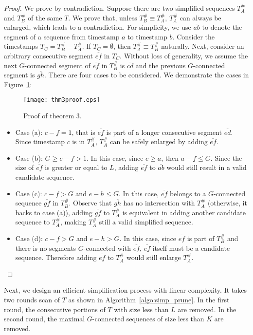 \begin{proof}
We prove by contradiction. Suppose there are two simplified sequences $T_A^\#$ and $T_B^\#$ of the same $T$. We prove that, unless $T_B^\# \equiv T_A^\#$, $T_A^\#$ can always be enlarged, which leads to a contradiction. For simplicity, we use $\overline{ab}$ to denote the segment of a sequence from timestamp $a$ to timestamp $b$.
Consider the timestamps $T_C=T_B^\# - T_A^\#$. If $T_C = \emptyset$, then $T_A^\# \equiv T_B^\#$ naturally. Next, consider an arbitrary consecutive segment $\overline{ef}$ in $T_C$. Without loss of generality, we assume the next $G$-connected segment of $\overline{ef}$ in $T_B^\#$ is $\overline{cd}$ and the previous $G$-connected segment is $\overline{gh}$. There are four cases to be considered. We demonstrate the cases in Figure~\ref{fig:proof_thm_3}:
\begin{figure}[h]
\centering
\texttt{[image: thm3proof.eps]}
\caption{Proof of theorem 3.}
\label{fig:proof_thm_3}
\end{figure}
\begin{itemize}
\item Case (a): $c-f = 1$, that is $\overline{ef}$ is part of a longer consecutive segment $\overline{ed}$. Since timestamp $c$ is in $T_A^\#$, $T_A^\#$ can be safely enlarged by adding $\overline{ef}$.
\item Case (b): $G \geq c-f> 1$. In this case, since $c\geq a$, then $a-f \leq G$. Since the size of $\overline{ef}$ is greater or equal to $L$, adding $\overline{ef}$ to $\overline{ab}$ would still result in a valid candidate sequence.
\item Case (c): $c-f > G$ and $e-h \leq G$. In this case, $\overline{ef}$ belongs to a $G$-connected sequence $\overline{gf}$ in $T_B^\#$. Observe that $\overline{gh}$ has no intersection with $T_A^\#$ (otherwise, it backs to case (a)), adding $\overline{gf}$ to $T_A^\#$ is equivalent in adding another candidate sequence to $T_A^\#$, making $T_A^\#$ still a valid simplified sequence.
\item Case (d): $c-f > G$ and $ e- h > G$. In this case, since $\overline{ef}$ is part of $T_B^\#$ and there is no segments $G$-connected with $\overline{ef}$, $\overline{ef}$ itself must be a candidate sequence. Therefore adding $\overline{ef}$ to $T_A^\#$ would still enlarge $T_A^\#$.
\end{itemize}
\end{proof}



Next, we design an efficient simplification process with linear complexity.
It takes two rounds scan of $T$ as shown in Algorithm~\ref{algo:simp_prune}. 
In the first round, the consecutive portions of $T$ with size less than $L$ are removed.
In the second round, the maximal $G$-connected sequences of size less than $K$ are removed. 


